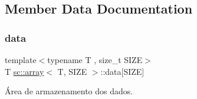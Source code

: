 \subsection{Member Data Documentation}
\mbox{\label{classsc_1_1array_a84479dfe2681e2bfeeef261267bbb200}} 
\subsubsection{\texorpdfstring{data}{data}}
{\footnotesize\ttfamily template$<$typename T , size\+\_\+t S\+I\+ZE$>$ \\
T \hyperlink{classsc_1_1array}{sc\+::array}$<$ T, S\+I\+ZE $>$\+::data\mbox{[}S\+I\+ZE\mbox{]}\hspace{0.3cm}{\ttfamily [private]}}



Área de armazenamento dos dados. 

